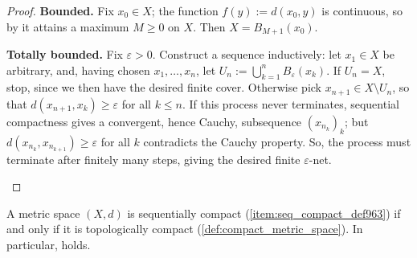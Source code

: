 \begin{proof}
\textbf{Bounded.} Fix $x_0 \in X$; the function $f(y) := d(x_0,y)$ is continuous, so by
 it attains a maximum $M \geq 0$ on $X$. Then
$X = B_{M+1}(x_0)$.

\textbf{Totally bounded.} Fix $\varepsilon > 0$. Construct a sequence inductively: let
$x_1 \in X$ be arbitrary, and, having chosen $x_1,\dots,x_n$, let
$U_n := \bigcup_{k=1}^n B_\varepsilon(x_k)$. If $U_n = X$, stop, since we then have the desired
finite cover. Otherwise pick $x_{n+1} \in X\setminus U_n$, so that $d(x_{n+1},x_k) \geq \varepsilon$ for
all $k \leq n$. If this process never terminates, sequential compactness gives a convergent, hence
Cauchy, subsequence $(x_{n_k})_k$; but $d(x_{n_k},x_{n_{k+1}}) \geq \varepsilon$ for all $k$
contradicts the Cauchy property. So, the process must terminate after finitely many steps, giving
the desired finite $\varepsilon$-net.

\begin{center}
\end{center}
\end{proof}

\begin{theorem}
\label{thm:sequential_topological_compactness_equivalence}
A metric space $(X,d)$ is sequentially compact (\cref{item:seq_compact_def963}) if and only if it
is topologically compact (\cref{def:compact_metric_space}). In particular,
 holds.
\end{theorem}

